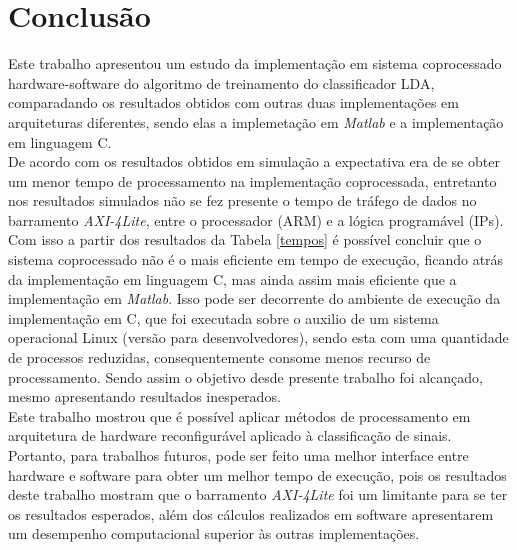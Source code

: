\chapter[Conclusao]{Conclusão}

Este trabalho apresentou um estudo da implementação em sistema coprocessado hardware-software do algoritmo de treinamento do classificador LDA, comparadando os resultados obtidos com outras duas implementações em arquiteturas diferentes, sendo elas a implemetação em \textit{Matlab} \cite{F.Lotte} e a implementação em linguagem C.\\

De acordo com os resultados obtidos em simulação a expectativa era de se obter um menor tempo de processamento na implementação coprocessada, entretanto nos resultados simulados não se fez presente o tempo de tráfego de dados no barramento \textit{AXI-4Lite}, entre o processador (ARM) e a lógica programável (IPs). Com isso a partir dos resultados da Tabela \ref{tempos} é possível concluir que o sistema coprocessado não é o mais eficiente em tempo de execução, ficando atrás da implementação em linguagem C, mas ainda assim mais eficiente que a implementação em \textit{Matlab}. Isso pode ser decorrente do ambiente de execução da implementação em C, que foi executada sobre o auxilio de um sistema operacional Linux (versão para desenvolvedores), sendo esta com uma quantidade de processos reduzidas, consequentemente consome menos recurso de processamento. Sendo assim o objetivo desde presente trabalho foi
alcançado, mesmo apresentando resultados inesperados.\\


Este trabalho mostrou que é possível aplicar métodos de processamento em arquitetura de hardware reconfigurável aplicado à classificação de sinais. Portanto, para trabalhos futuros, pode ser feito uma melhor interface entre hardware e software para obter um melhor tempo de execução, pois os resultados deste trabalho mostram que o barramento \textit{AXI-4Lite} foi um limitante para se ter os resultados esperados, além dos cálculos realizados em software apresentarem um desempenho computacional superior às outras implementações.

